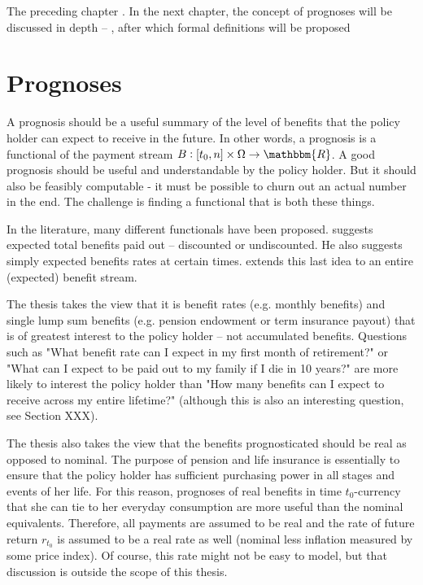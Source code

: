 \documentclass{book}
\newcommand{\1}[1]{\mathbbm{1}_{\left\lbrace #1 \right\rbrace}}
\theoremstyle{break}
\theoremstyle{remark}
\numberwithin{equation}{section}
\begin{document}
The preceding chapter . In the next chapter, the concept of prognoses will be discussed in depth -- , after which formal definitions will be proposed

\newpage

\chapter{Prognoses}

A prognosis should be a useful summary of the level of benefits that the policy holder can expect to receive in the future. In other words, a prognosis is a functional of the payment stream $B: [t_0,n] \times \Omega \to \mathbbm{R}$. A good prognosis should be useful and understandable by the policy holder. But it should also be feasibly computable - it must be possible to churn out an actual number in the end. The challenge is finding a functional that is both these things.

In the literature, many different functionals have been proposed. \cite{Norberg2001} suggests expected total benefits paid out -- discounted or undiscounted. He also suggests simply expected benefits rates at certain times. \cite{NinnaReitzel} extends this last idea to an entire (expected) benefit stream.

The thesis takes the view that it is benefit rates (e.g. monthly benefits) and single lump sum benefits (e.g. pension endowment or term insurance payout) that is of greatest interest to the policy holder -- not accumulated benefits. Questions such as "What benefit rate can I expect in my first month of retirement?" or "What can I expect to be paid out to my family if I die in 10 years?" are more likely to interest the policy holder than "How many benefits can I expect to receive across my entire lifetime?" (although this is also an interesting question, see Section XXX).

The thesis also takes the view that the benefits prognosticated should be real as opposed to nominal. The purpose of pension and life insurance is essentially to ensure that the policy holder has sufficient purchasing power in all stages and events of her life. For this reason, prognoses of real benefits in time $t_0$-currency that she can tie to her everyday consumption are more useful than the nominal equivalents. Therefore, all payments are assumed to be real and the rate of future return $r_{t_0}$ is assumed to be a real rate as well (nominal less inflation measured by some price index). Of course, this rate might not be easy to model, but that discussion is outside the scope of this thesis.
\end{document}
